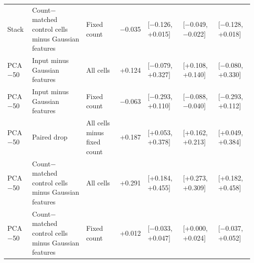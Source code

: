 \begin{tabular}{lllllll}
Stack & Count$-$matched control cells minus Gaussian features & Fixed count & $-$0.035 & [$-$0.126, +0.015] & [$-$0.049, $-$0.022] & [$-$0.128, +0.018] \\
PCA$-$50 & Input minus Gaussian features & All cells & +0.124 & [$-$0.079, +0.327] & [+0.108, +0.140] & [$-$0.080, +0.330] \\
PCA$-$50 & Input minus Gaussian features & Fixed count & $-$0.063 & [$-$0.293, +0.110] & [$-$0.088, $-$0.040] & [$-$0.293, +0.112] \\
PCA$-$50 & Paired drop & All cells minus fixed count & +0.187 & [+0.053, +0.378] & [+0.162, +0.213] & [+0.049, +0.384] \\
PCA$-$50 & Count$-$matched control cells minus Gaussian features & All cells & +0.291 & [+0.184, +0.455] & [+0.273, +0.309] & [+0.182, +0.458] \\
PCA$-$50 & Count$-$matched control cells minus Gaussian features & Fixed count & +0.012 & [$-$0.033, +0.047] & [+0.000, +0.024] & [$-$0.037, +0.052] \\
\bottomrule
\end{tabular}
